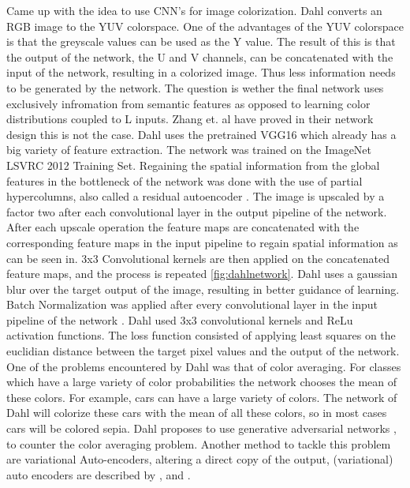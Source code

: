 \cite{Dahl} Came up with the idea to use CNN's for image colorization. Dahl converts an RGB image to the YUV colorspace. One of the advantages of the YUV colorspace is that the greyscale values can be used as the Y value. The result of this is that the output of the network, the U and V channels, can be concatenated with the input of the network, resulting in a colorized image. Thus less information needs to be generated by the network. The question is wether the final network uses exclusively infromation from semantic features as opposed to learning color distributions coupled to L inputs. Zhang et. al \cite{Zhang} have proved in their network design this is not the case. Dahl uses the pretrained VGG16 which already has a big variety of feature extraction. The network was trained on the ImageNet LSVRC 2012 Training Set. Regaining the spatial information from the global features in the bottleneck of the network was done with the use of partial hypercolumns, also called a residual autoencoder \cite{hariharan2015hypercolumns}. The image is upscaled by a factor two after each convolutional layer in the output pipeline of the network. After each upscale operation the feature maps are concatenated with the corresponding feature maps in the input pipeline to regain spatial information as can be seen in. 3x3 Convolutional kernels are then applied on the concatenated feature maps, and the process is repeated \ref{fig:dahlnetwork}. Dahl uses a gaussian blur over the target output of the image, resulting in better guidance of learning. Batch Normalization was applied after every convolutional layer in the input pipeline of the network \cite{ioffe2015batch}. Dahl used 3x3 convolutional kernels and ReLu activation functions. The loss function consisted of applying least squares on the euclidian distance between the target pixel values and the output of the network. One of the problems encountered by Dahl was that of color averaging. For classes which have a large variety of color probabilities the network chooses the mean of these colors. For example, cars can have a large variety of colors. The network of Dahl will colorize these cars with the mean of all these colors, so in most cases cars will be colored sepia. Dahl proposes to use generative adversarial networks \cite{Radford}, to counter the color averaging problem. Another method to tackle this problem are variational Auto-encoders, altering a direct copy of the output, (variational) auto encoders are described by \cite{Gregor}, \cite{Kingma} and \cite{GoodfellowBOOK}. 


